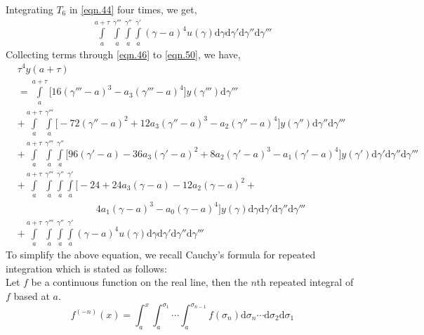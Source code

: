 \documentclass{article}
\begin{document}
Integrating $T_6$ in \eqref{eqn.44} four times, we get,
\begin{equation}\label{eqn.50}
\begin{split}
	\int\limits_{a}^{a+\tau}\int\limits_{a}^{\gamma'''}\int\limits_{a}^{\gamma''}\int\limits_{a}^{\gamma'}(\gamma-a)^4u(\gamma)\mathrm{d}\gamma\mathrm{d}\gamma'\mathrm{d}\gamma''\mathrm{d}\gamma'''
\end{split}
\end{equation}
Collecting terms through \eqref{eqn.46} to \eqref{eqn.50}, we have,
\begin{equation}\label{eqn.51}
\begin{split}
	&\tau^4y(a+\tau)\\
	&=\int\limits_{a}^{a+\tau}\bigg[16(\gamma'''-a)^{3}-a_3(\gamma'''-a)^{4}\bigg]y(\gamma''')\mathrm{d}\gamma'''\\
	&+\int\limits_{a}^{a+\tau}\int\limits_{a}^{\gamma'''}\bigg[-72(\gamma''-a)^{2} + 12a_3(\gamma''-a)^{3} - a_2(\gamma''-a)^{4}\bigg]y(\gamma'')\mathrm{d}\gamma''\mathrm{d}\gamma'''\\
	&+\int\limits_{a}^{a+\tau}\int\limits_{a}^{\gamma'''}\int\limits_{a}^{\gamma''}\bigg[96(\gamma'-a)-36a_3(\gamma'-a)^2+8a_2(\gamma'-a)^3-a_1(\gamma'-a)^4\bigg]y(\gamma')\mathrm{d}\gamma'\mathrm{d}\gamma''\mathrm{d}\gamma'''\\
	&+\int\limits_{a}^{a+\tau}\int\limits_{a}^{\gamma'''}\int\limits_{a}^{\gamma''}\int\limits_{a}^{\gamma'}\bigg[-24+24a_3(\gamma-a)-12a_2(\gamma-a)^{2}+\\&\qquad\qquad\qquad\qquad{}4a_1(\gamma-a)^{3}-a_0(\gamma-a)^{4}\bigg]y(\gamma)\mathrm{d}\gamma\mathrm{d}\gamma'\mathrm{d}\gamma''\mathrm{d}\gamma'''\\
	&+\int\limits_{a}^{a+\tau}\int\limits_{a}^{\gamma'''}\int\limits_{a}^{\gamma''}\int\limits_{a}^{\gamma'}(\gamma-a)^4u(\gamma)\mathrm{d}\gamma\mathrm{d}\gamma'\mathrm{d}\gamma''\mathrm{d}\gamma'''
\end{split}
\end{equation}
To simplify the above equation, we recall Cauchy's formula for repeated integration which is stated as follows:\\
Let $f$ be a continuous function on the real line, then the $n$th repeated integral of $f$ based at $a$.
\begin{equation}\label{eqn.52}
f^{(-n)}(x) = \int_{a}^{x}\int_{a}^{\sigma_{1}} \cdots \int_{a}^{\sigma_{n-1}} f(\sigma_n)\mathrm{d}\sigma_{n} \cdots \mathrm{d}\sigma_2 \mathrm{d}\sigma_1
\end{equation}
\end{document}
